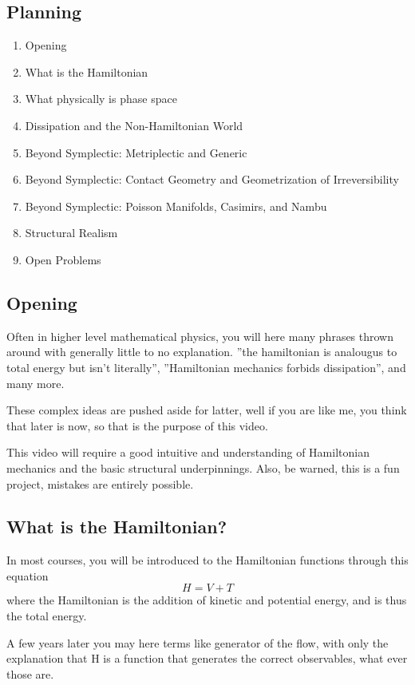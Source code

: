 \subsection{Planning}

\begin{enumerate}
  \item Opening
  \item What is the Hamiltonian
  \item What physically is phase space
  \item Dissipation and the Non-Hamiltonian World
  \item Beyond Symplectic: Metriplectic and Generic
  \item Beyond Symplectic: Contact Geometry and Geometrization of Irreversibility
  \item Beyond Symplectic: Poisson Manifolds, Casimirs, and Nambu
  \item Structural Realism
  \item Open Problems
\end{enumerate}

\subsection{Opening}

Often in higher level mathematical physics, you will here many phrases thrown around with generally little to no explanation. ''the hamiltonian is analougus to total energy but isn't literally'', ''Hamiltonian mechanics forbids dissipation'', and many more.

These complex ideas are pushed aside for latter, well if you are like me, you think that later is now, so that is the purpose of this video.

This video will require a good intuitive and understanding of Hamiltonian mechanics and the basic structural underpinnings. Also, be warned, this is a fun project, mistakes are entirely possible.

\subsection{What is the Hamiltonian?}

In most courses, you will be introduced to the Hamiltonian functions through this equation
\[
H = V + T
\]
where the Hamiltonian is the addition of kinetic and potential energy, and is thus the total energy.

A few years later you may here terms like generator of the flow, with only the explanation that H is a function that generates the correct observables, what ever those are.

